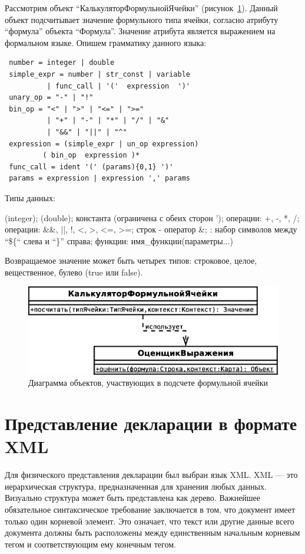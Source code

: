 \documentclass[14pt,a4paper]{reportmod}
\begin{document}
Рассмотрим объект ``КалькуляторФормульнойЯчейки'' (рисунок~\ref{pic:classes_4}). Данный объект подсчитывает значение формульного типа ячейки, согласно атрибуту ``формула'' объекта ``Формула''. Значение атрибута является выражением на формальном языке. Опишем грамматику данного языка:

\begin{verbatim}
 number = integer | double
 simple_expr = number | str_const | variable
          | func_call | '('  expression  ')'
 unary_op = "-" | "!"
 bin_op = "<" | ">" | "<=" | ">="
          | "+" | "-" | "*" | "/" | "&"
          | "&&" | "||" | "^"
 expression = (simple_expr | un_op expression)
         ( bin_op  expression )*
 func_call = ident '(' (params){0,1} ')'
 params = expression | expression ',' params
\end{verbatim}

Типы данных:
\begin{itemize}
  (integer);
  (double);
   константа (ограничена с обеих сторон ');
   операции: +, -, *, /;
   операции: \&\&, ||, !, <, >, <=, >=;
   строк - оператор \&;
  : набор символов между ``\$\{`` слева и ``\}'' справа;
   функции: имя\_функции(параметры...)
\end{itemize}

Возвращаемое значение может быть четырех типов: строковое, целое, вещественное, булево (true или false).

\begin{figure}
  \centering
  \includegraphics[scale=0.4]{uml/_classes_4}
  \caption{Диаграмма объектов, участвующих в подсчете формульной ячейки}
  \label{pic:classes_4}
\end{figure}

\section{Представление декларации в формате XML}
Для физического представления декларации был выбран язык XML. XML — это иерархическая структура, предназначенная для хранения любых данных. Визуально структура может быть представлена как дерево. Важнейшее обязательное синтаксическое требование заключается в том, что документ имеет только один корневой элемент. Это означает, что текст или другие данные всего документа должны быть расположены между единственным начальным корневым тегом и соответствующим ему конечным тегом.
\end{document}
